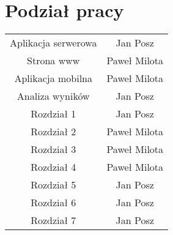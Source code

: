 \chapter{Podział pracy}
\label{cha:podzial_prac}

\begin{center}
\begin{tabular}{ |c|c| } 
 \hline
 Aplikacja serwerowa & Jan Posz \\ 
 Strona www & Paweł Milota \\ 
 Aplikacja mobilna & Paweł Milota \\ 
 Analiza wyników & Jan Posz \\
 Rozdział 1 & Jan Posz \\ 
 Rozdział 2 & Paweł Milota \\
 Rozdział 3 & Paweł Milota \\
 Rozdział 4 & Paweł Milota \\
 Rozdział 5 & Jan Posz \\
 Rozdział 6 & Jan Posz \\
 Rozdział 7 & Jan Posz \\
 \hline
\end{tabular}
\end{center}